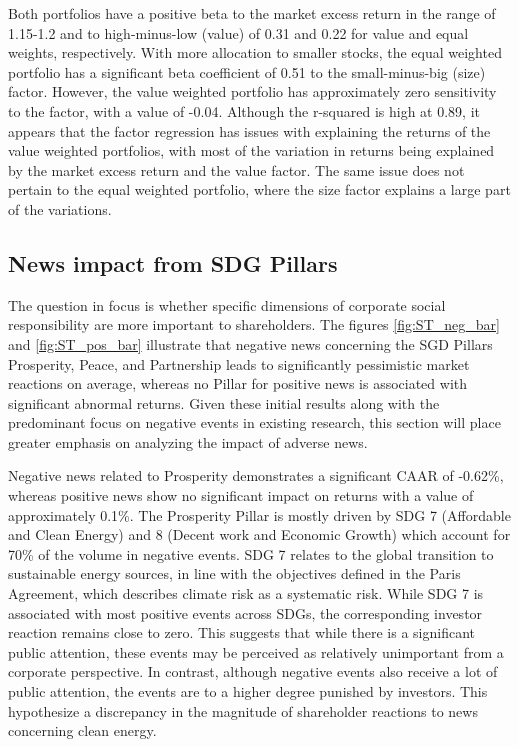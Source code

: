 Both portfolios have a positive beta to the market excess return in the range of 1.15-1.2 and to high-minus-low (value) of 0.31 and 0.22 for value and equal weights, respectively. With more allocation to smaller stocks, the equal weighted portfolio has a significant beta coefficient of 0.51 to the small-minus-big (size) factor. However, the value weighted portfolio has approximately zero sensitivity to the factor, with a value of -0.04. Although the r-squared is high at 0.89, it appears that the factor regression has issues with explaining the returns of the value weighted portfolios, with most of the variation in returns being explained by the market excess return and the value factor. The same issue does not pertain to the equal weighted portfolio, where the size factor explains a large part of the variations. 






\subsection{News impact from SDG Pillars} \label{sec: short_term_analysis_SDG}

The question in focus is whether specific dimensions of corporate social responsibility are more important to shareholders. The figures \ref{fig:ST_neg_bar} and \ref{fig:ST_pos_bar} illustrate that negative news concerning the SGD Pillars Prosperity, Peace, and Partnership leads to significantly pessimistic market reactions on average, whereas no Pillar for positive news is associated with significant abnormal returns. Given these initial results along with the predominant focus on negative events in existing research, this section will place greater emphasis on analyzing the impact of adverse news. 

Negative news related to Prosperity demonstrates a significant CAAR of -0.62\%, whereas positive news show no significant impact on returns with a value of approximately 0.1\%. The Prosperity Pillar is mostly driven by SDG 7 (Affordable and Clean Energy) and 8 (Decent work and Economic Growth) which account for 70\% of the volume in negative events. SDG 7 relates to the global transition to sustainable energy sources, in line with the objectives defined in the Paris Agreement, which describes climate risk as a systematic risk. While SDG 7 is associated with most positive events across SDGs, the corresponding investor reaction remains close to zero. This suggests that while there is a significant public attention, these events may be perceived as relatively unimportant from a corporate perspective. In contrast, although negative events also receive a lot of public attention, the events are to a higher degree punished by investors. This hypothesize a discrepancy in the magnitude of shareholder reactions to news concerning clean energy. 

